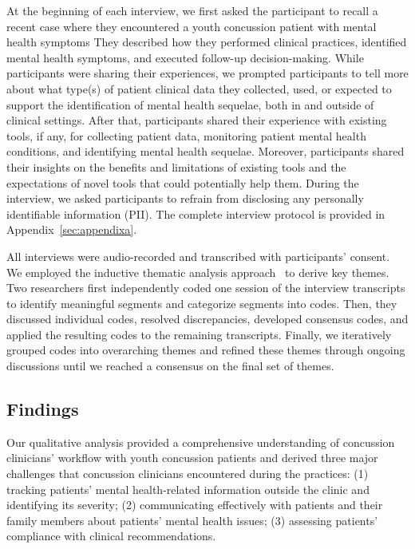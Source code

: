 At the beginning of each interview, we first asked the participant to recall a recent case where they encountered a youth concussion patient with mental health symptoms 
They described how they performed clinical practices, identified mental health symptoms, and executed follow-up decision-making.
While participants were sharing their experiences, we prompted participants to tell more about what type(s) of patient clinical data they collected, used, or expected to support the identification of mental health sequelae, both in and outside of clinical settings.
After that, participants shared their experience with existing tools, if any, for collecting patient data, monitoring patient mental health conditions, and identifying mental health sequelae. 
Moreover, participants shared their insights on the benefits and limitations of existing tools and the expectations of novel tools that could potentially help them.
During the interview, we asked participants to refrain from disclosing any personally identifiable information (PII). 
The complete interview protocol is provided in Appendix~\ref{sec:appendixa}.



All interviews were audio-recorded and transcribed with participants' consent. 
We employed the inductive thematic analysis approach~\cite{braun2012thematic,braun2019reflecting} to derive key themes. 
Two researchers first independently coded one session of the interview transcripts to identify meaningful segments and categorize segments into codes. 
Then, they discussed individual codes, resolved discrepancies, developed consensus codes, and applied the resulting codes to the remaining transcripts.
Finally, we iteratively grouped codes into overarching themes and refined these themes through ongoing discussions until we reached a consensus on the final set of themes.




\subsection{Findings}
\label{sec:formative-findings}

Our qualitative analysis provided a comprehensive understanding of concussion clinicians' workflow with youth concussion patients and derived three major challenges that concussion clinicians encountered during the practices: 
(1) tracking patients’ mental health-related information outside the clinic and identifying its severity;
(2) communicating effectively with patients and their family members about patients' mental health issues;
(3) assessing patients' compliance with clinical recommendations.



